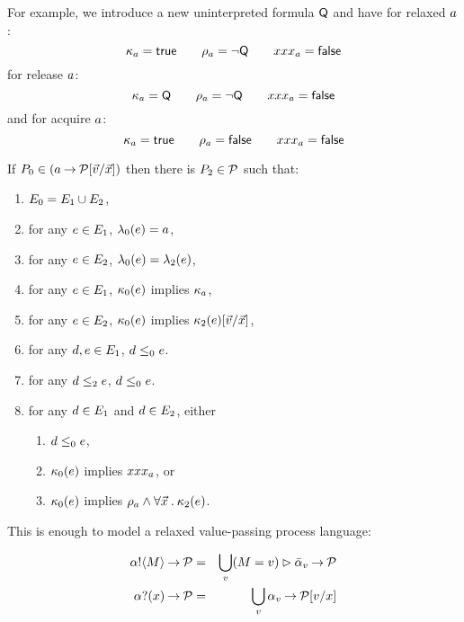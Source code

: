 For example, we introduce a new uninterpreted formula $\mathsf{Q}$
and have for relaxed $a$:
\[
  \kappa_{a} = \mathsf{true}
\qquad
  \rho_{a} = \neg\mathsf{Q}
\qquad
  xxx_{a} = \mathsf{false}
\]
for release $a$:
\[
  \kappa_{a} = \mathsf{Q}
\qquad
  \rho_{a} = \neg\mathsf{Q}
\qquad
  xxx_{a} = \mathsf{false}
\]
and for acquire $a$:
\[
  \kappa_{a} = \mathsf{true}
\qquad
  \rho_{a} = \mathsf{false}
\qquad
  xxx_{a} = \mathsf{false}
\]

\begin{definition}
  \label{defn:pomset-wprefix}
  If $P_0 \in (a\mathbin{\rightarrow}\mathcal{P}[\vec{v}/\vec{x}])$ then there is $P_2\in\mathcal{P}$ such that:
  \begin{enumerate}
  \item $E_0=E_1 \cup E_2$,
  \item for any $e\in E_1$, $\lambda_0(e) = a$,
  \item for any $e\in E_2$, $\lambda_0(e) = \lambda_2(e)$,
  \item for any $e\in E_1$, $\kappa_0(e)$ implies $\kappa_a$,
  \item for any $e\in E_2$, $\kappa_0(e)$ implies $\kappa_2(e)[\vec{v}/\vec{x}]$,
  \item for any $d,e\in E_1$, $d\le_0e$.
  \item for any $d\le_2e$, $d\le_0e$.
  \item for any $d\in E_1$ and $d\in E_2$, either
    \begin{enumerate}
    \item $d\le_0e$,
    \item $\kappa_0(e)$ implies $xxx_a$, or
    \item $\kappa_0(e)$ implies $\rho_a\land\forall\vec{x}\mathbin.\kappa_2(e)$.
    \end{enumerate}
  \end{enumerate}
\end{definition}

This is enough to model a relaxed value-passing process language:

\begin{eqnarray*}
  \sSEND\aChan\aExp\wPREFIX\aPSS & = &
  \bigcup_\aVal (\aExp=\aVal) \sGUARD \send\aChan{\aVal} \wPREFIX \aPSS
\\
  \sRECV\aChan\aVar\wPREFIX\aPSS & = &
  \bigcup_\aVal \recv\aChan{\aVal} \wPREFIX \aPSS[\aVal/\aVar]
\end{eqnarray*}

